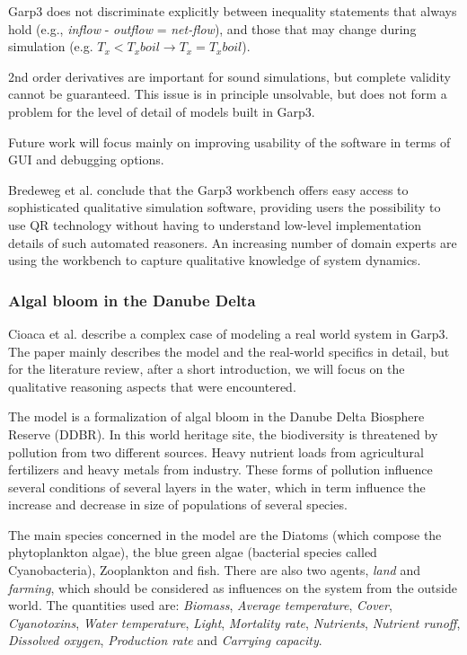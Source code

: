 \documentclass{article} %
\begin{document}
Garp3 does not discriminate explicitly between inequality statements that
always hold (e.g., \emph{inflow} - \emph{outflow} = 
\emph{net-flow}), and those that may change during simulation 
(e.g. $T_x < T_xboil \rightarrow T_x = T_xboil$).

\vspace{0.8em}

2nd order derivatives are important for sound simulations, but complete
validity cannot be guaranteed. This issue is in principle unsolvable, but does
not form a problem for the level of detail of models built in Garp3.  

Future work will focus mainly on improving usability of the software in terms
of GUI and debugging options.

Bredeweg et al. conclude that the Garp3 workbench offers easy access to 
sophisticated qualitative simulation software, providing users the 
possibility to use QR technology without having to understand low-level 
implementation details of such automated reasoners. An increasing number of 
domain experts are using the workbench to capture qualitative knowledge of 
system dynamics.  

\subsubsection{Algal bloom in the Danube Delta}
\label{sec:litrev_qr_cioca}
Cioaca et al. describe a complex case of modeling a real world system in Garp3.
The paper mainly describes the model and the real-world specifics in detail, but 
for the literature review, after a short introduction, we will focus on the 
qualitative reasoning aspects that were encountered.

\vspace{0.8em}

The model is a formalization of algal bloom in the Danube Delta Biosphere
Reserve (DDBR). In this world heritage site, the biodiversity is threatened by
pollution from two different sources. Heavy nutrient loads from agricultural 
fertilizers and heavy metals from industry. These forms of pollution
influence several conditions of several layers in the water, which in term
influence the increase and decrease in size of populations of several species.

The main species concerned in the model are the Diatoms (which compose the
phytoplankton algae), the blue green algae (bacterial species called
Cyanobacteria), Zooplankton and fish. There are also two agents, \emph{land} and
\emph{farming}, which should be considered as influences on the system from the
outside world. The quantities used are: \emph{Biomass}, \emph{Average
temperature}, \emph{Cover}, \emph{Cyanotoxins}, \emph{Water temperature},
\emph{Light}, \emph{Mortality rate}, \emph{Nutrients}, \emph{Nutrient runoff},
\emph{Dissolved oxygen}, \emph{Production rate} and \emph{Carrying capacity}.
\end{document}
